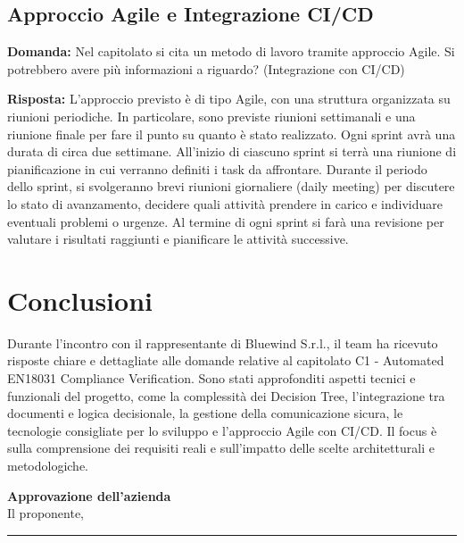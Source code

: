 \documentclass[a4paper,12pt]{article}
\begin{document}
{    \subsection{Approccio Agile e Integrazione CI/CD}
    \textbf{Domanda:} Nel capitolato si cita un metodo di lavoro tramite approccio Agile. Si potrebbero avere più informazioni a riguardo? (Integrazione con CI/CD)

    \textbf{Risposta:} L'approccio previsto è di tipo Agile, con una struttura organizzata su riunioni periodiche. In particolare, sono previste riunioni settimanali e una riunione finale per fare il punto su quanto è stato realizzato. Ogni sprint avrà una durata di circa due settimane. All'inizio di ciascuno sprint si terrà una riunione di pianificazione in cui verranno definiti i task da affrontare. Durante il periodo dello sprint, si svolgeranno brevi riunioni giornaliere (daily meeting) per discutere lo stato di avanzamento, decidere quali attività prendere in carico e individuare eventuali problemi o urgenze. Al termine di ogni sprint si farà una revisione per valutare i risultati raggiunti e pianificare le attività successive.

}
\newpage

\section{Conclusioni}{
  Durante l'incontro con il rappresentante di Bluewind S.r.l., il team ha ricevuto risposte chiare e dettagliate alle domande relative al capitolato C1 - Automated EN18031 Compliance Verification.
  Sono stati approfonditi aspetti tecnici e funzionali del progetto, come la complessità dei Decision Tree, l'integrazione tra documenti e logica decisionale, la gestione della comunicazione sicura, le tecnologie consigliate per lo sviluppo e l'approccio Agile con CI/CD. Il focus è sulla comprensione dei requisiti reali e sull'impatto delle scelte architetturali e metodologiche.
}

\vspace{2cm}
\begin{flushright}
    \textbf{Approvazione dell'azienda} \\
    Il proponente,\\[0.5cm]
    \rule{6cm}{0.4pt}\\
\end{flushright}
\end{document}
